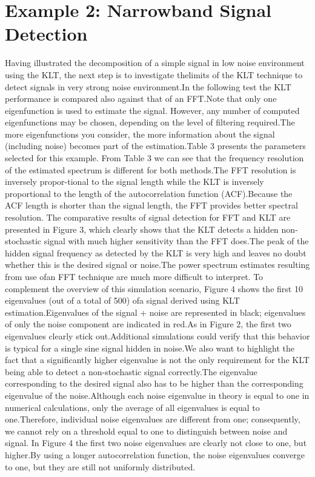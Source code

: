 \documentclass[12pt]{report}
\begin{document}
\section*{Example 2: Narrowband Signal Detection}
Having illustrated the decomposition of a simple signal in low noise environment using the KLT, the next step is to
investigate thelimits of the KLT technique to detect signals in very strong noise environment.\@ In the following test the KLT performance is compared also against that of an FFT.\@ Note that only one eigenfunction is used to estimate the signal.
However, any number of computed eigenfunctions may be chosen, depending on the level of filtering required.\@ The more eigenfunctions you consider, the more information about the signal (including noise) becomes part of the estimation.\@ Table 3 presents the parameters selected for this example.
From Table 3 we can see that the frequency resolution of the estimated spectrum is different for both methods.\@ The FFT resolution is inversely propor-tional to the signal length while the KLT is inversely proportional to the length of the autocorrelation function (ACF).\@ Because the ACF length is shorter than the signal length, the FFT provides better spectral resolution.
The comparative results of signal detection for FFT and KLT are presented in Figure 3, which clearly shows that the KLT detects a hidden non-stochastic signal with much higher sensitivity than the FFT does.\@ The peak of the hidden signal frequency as detected by the KLT is very high and leaves no doubt whether this is the desired signal or noise.\@ The power spectrum estimates resulting from use ofan FFT technique are much more difficult to interpret.
To complement the overview of this simulation scenario, Figure 4 shows the first 10 eigenvalues (out of a total of 500) ofa signal derived using KLT estimation.\@ Eigenvalues of the signal + noise are represented in black; eigenvalues of only the noise component are indicated in red.\@ As in Figure 2, the first two eigenvalues clearly stick out.\@ Additional simulations could verify that this behavior is typical for a single sine signal hidden in noise.We also want to highlight the fact that a significantly higher
eigenvalue is not the only requirement for the KLT being able to detect a non-stochastic signal correctly.\@ The eigenvalue corresponding to the desired signal also has to be higher than the corresponding eigenvalue of the noise.\@ Although each noise eigenvalue in theory is equal to one in numerical calculations, only the average of all eigenvalues is equal to one.\@ Therefore, individual noise eigenvalues are different from one; consequently, we cannot rely on a threshold equal to one to distinguish between noise and signal.
In Figure 4 the first two noise eigenvalues are clearly not close to one, but higher.\@ By using a longer autocorrelation function, the noise eigenvalues converge to one, but they are still not
uniformly distributed.
\end{document}
